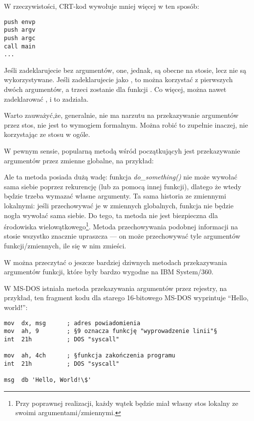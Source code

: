 W rzeczywistości, \ac{CRT}-kod wywołuje \main mniej więcej w ten sposób:
	
\begin{lstlisting}[style=customasmx86]
push envp
push argv
push argc
call main
...
\end{lstlisting}

Jeśli zadeklarujecie \main bez argumentów, one, jednak, są obecne na stosie, lecz nie są wykorzystywane.
Jeśli zadeklarujecie \main jako , 
to można korzystać z pierwszych dwóch argumentów, a trzeci zostanie dla funkcji .
Co więcej, można nawet zadeklarować , i to zadziała.


Warto zauważyć,że, generalnie, nie ma narzutu na przekazywanie argumentów przez stos, nie jest to wymogiem formalnym.
Można robić to zupełnie inaczej, nie korzystając ze stosu w ogóle.

W pewnym sensie, popularną metodą wśród początkującyh jest przekazywanie argumentów przez zmienne globalne, na przykład:



Ale ta metoda posiada dużą wadę: funkcja \emph{do\_something()} nie może wywołać sama siebie poprzez rekurencję (lub za pomocą innej funkcji),
dlatego że wtedy będzie trzeba wymazać własne argumenty.
Ta sama historia ze zmiennymi lokalnymi: jeśli przechowywać je w zmiennych globalnych, funkcja nie będzie nogła wywołać sama siebie.
Do tego, ta metoda nie jest biezpieczna dla środowiska wielowątkowego\footnote{Przy poprawnej realizacji,
każdy wątek będzie miał własny stos lokalny ze swoimi argumentami/zmiennymi.}.
Metoda przechowywania podobnej informacji na stosie wszystko znacznie upraszcza ---
on może przechowywać tyle argumentów funkcji/zmiennych,
ile się w nim zmieści.

W  można przeczytać o jeszcze bardziej dziwnych metodach przekazywania argumentów funkcji, które były bardzo wygodne na
 IBM System/360.


W MS-DOS istniała metoda przekazywania argumentów przez rejestry, na przykład, ten fragment kodu dla starego 16-bitowego MS-DOS
wyprintuje ``Hello, world!'':

\begin{lstlisting}[style=customasmx86]
mov  dx, msg      ; adres powiadomienia
mov  ah, 9        ; §9 oznacza funkcję "wyprowadzenie linii"§
int  21h          ; DOS "syscall"

mov  ah, 4ch      ; §funkcja zakończenia programu
int  21h          ; DOS "syscall"

msg  db 'Hello, World!\$'
\end{lstlisting}

